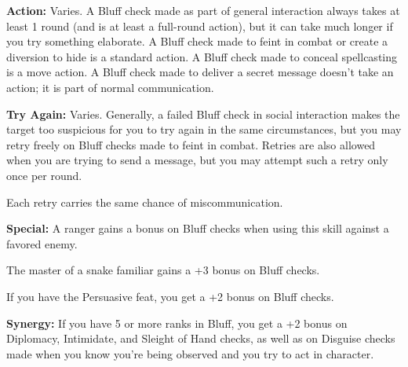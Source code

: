\textbf{Action:} Varies. A Bluff check made as part of general interaction always takes at least 1 round (and is at least a full-round action), but it can take much longer if you try something elaborate. A Bluff check made to feint in combat or create a diversion to hide is a standard action. A Bluff check made to conceal spellcasting is a move action. A Bluff check made to deliver a secret message doesn’t take an action; it is part of normal communication.

\textbf{Try Again:} Varies. Generally, a failed Bluff check in social interaction makes the target too suspicious for you to try again in the same circumstances, but you may retry freely on Bluff checks made to feint in combat. Retries are also allowed when you are trying to send a message, but you may attempt such a retry only once per round.

Each retry carries the same chance of miscommunication.

\textbf{Special:} A ranger gains a bonus on Bluff checks when using this skill against a favored enemy.

The master of a snake familiar gains a +3 bonus on Bluff checks.

If you have the Persuasive feat, you get a +2 bonus on Bluff checks.

\textbf{Synergy:} If you have 5 or more ranks in Bluff, you get a +2 bonus on Diplomacy, Intimidate, and Sleight of Hand checks, as well as on Disguise checks made when you know you’re being observed and you try to act in character.


